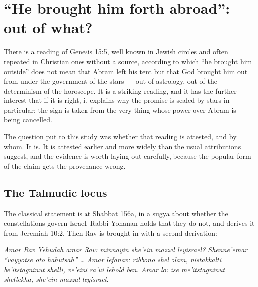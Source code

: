 \section{``He brought him forth abroad'': out of what?}

There is a reading of Genesis 15:5, well known in Jewish circles and often
repeated in Christian ones without a source, according to which ``he brought him
outside'' does not mean that Abram left his tent but that God brought him out
from under the government of the stars --- out of astrology, out of the
determinism of the horoscope. It is a striking reading, and it has the further
interest that if it is right, it explains why the promise is sealed by stars in
particular: the sign is taken from the very thing whose power over Abram is being
cancelled.

The question put to this study was whether that reading is attested, and by
whom. It is. It is attested earlier and more widely than the usual attributions
suggest, and the evidence is worth laying out carefully, because the popular
form of the claim gets the provenance wrong.

\subsection{The Talmudic locus}

The classical statement is at Shabbat 156a, in a sugya about whether the
constellations govern Israel. Rabbi Yohanan holds that they do not, and derives
it from Jeremiah 10:2. Then Rav is brought in with a second derivation:

\begin{studyframe}
\textit{Amar Rav Yehudah amar Rav: minnayin she'ein mazzal leyisrael? Shenne'emar
``vayyotse oto hahutsah'' \dots{} Amar lefanav: ribbono shel olam, nistakkalti
be'itstagninut shelli, ve'eini ra'ui lehold ben. Amar lo: tse me'itstagninut
shellekha, she'ein mazzal leyisrael.}
\end{studyframe}

